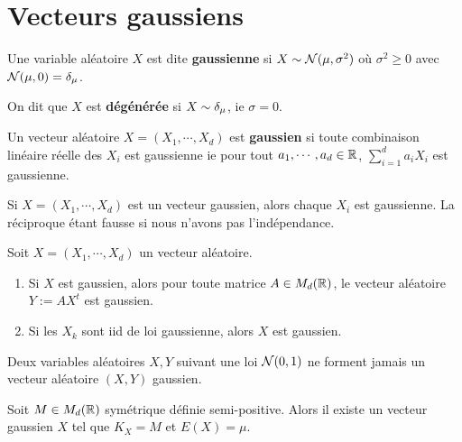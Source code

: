 \section{Vecteurs gaussiens}

\begin{definition}
	Une variable aléatoire $X$ est dite \textbf{gaussienne} si $X \sim
	\mathcal{N}(\mu, \sigma^{2})$ où $\sigma^{2} \geq 0$ avec
	$\mathcal{N}(\mu, 0) = \delta_{\mu}$.

	On dit que $X$ est \textbf{dégénérée} si $X \sim \delta_{\mu}$, ie
	$\sigma = 0$.
\end{definition}

\begin{definition}
	Un vecteur aléatoire $X = (X_{1}, \cdots, X_{d})$ est \textbf{gaussien} si
	toute combinaison linéaire réelle des $X_{i}$ est gaussienne ie pour tout
	$a_{1}, \cdots, a_{d} \in \mathbb{R}$, $\displaystyle \sum_{i = 1}^{d}
	a_{i}X_{i}$ est gaussienne.
\end{definition}

\begin{remarque}
	Si $X = (X_{1}, \cdots, X_{d})$ est un vecteur gaussien, alors chaque
	$X_{i}$ est gaussienne. La réciproque étant fausse si nous n'avons pas
	l'indépendance.
\end{remarque}

\begin{proposition}
	Soit $X = (X_{1}, \cdots, X_{d})$ un vecteur aléatoire.
	\begin{enumerate}
		\item Si $X$ est gaussien, alors pour toute matrice $A \in M_{d}(\mathbb{R})$, le vecteur aléatoire $Y := A
			X^{t}$ est gaussien.
		\item Si les $X_{k}$ sont iid de loi gaussienne, alors $X$ est gaussien.
	\end{enumerate}
\end{proposition}

\begin{remarque}
	Deux variables aléatoires $X, Y$ suivant une loi $\mathcal{N}(0, 1)$ ne
	forment jamais un vecteur aléatoire $(X, Y)$ gaussien.
\end{remarque}

\begin{theorem}
	Soit $M \in M_{d}(\mathbb{R})$ symétrique définie semi-positive. Alors
	il existe un vecteur gaussien $X$ tel que $K_{X} = M$ et $E(X) = \mu$.
\end{theorem}

